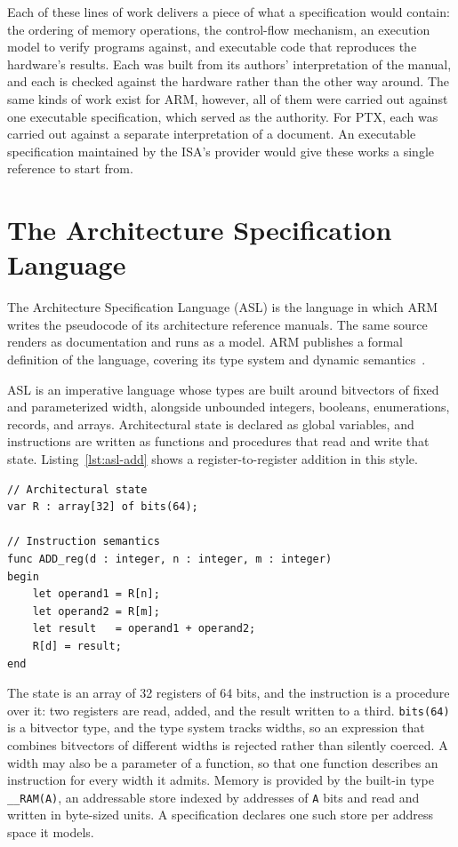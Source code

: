Each of these lines of work delivers a piece of what a specification would
contain: the ordering of memory operations, the control-flow mechanism, an
execution model to verify programs against, and executable code that
reproduces the hardware's results. Each was built from its authors'
interpretation of the manual, and each is checked against the hardware
rather than the other way around. The same kinds of work exist for ARM,
however, all of them were carried out against one executable
specification, which served as the authority. For PTX, each was carried out
against a separate interpretation of a document. An executable specification
maintained by the ISA's provider would give these works a single reference
to start from.

\section{The Architecture Specification Language}
\label{sec:asl}

The Architecture Specification Language (ASL) is the language in which ARM
writes the pseudocode of its architecture reference manuals. The same source
renders as documentation and runs as a model. ARM publishes a formal
definition of the language, covering its type system and dynamic
semantics~\cite{asl-reference}.

ASL is an imperative language whose types are built around bitvectors of
fixed and parameterized width, alongside unbounded integers, booleans,
enumerations, records, and arrays. Architectural state is declared as
global variables, and instructions are written as functions and procedures
that read and write that state. Listing~\ref{lst:asl-add} shows a
register-to-register addition in this style.

\begin{lstlisting}[language=ASL, caption={An ASL specification of a
register-to-register addition.}, label={lst:asl-add}]
// Architectural state
var R : array[32] of bits(64);

// Instruction semantics
func ADD_reg(d : integer, n : integer, m : integer)
begin
    let operand1 = R[n];
    let operand2 = R[m];
    let result   = operand1 + operand2;
    R[d] = result;
end
\end{lstlisting}

The state is an array of 32 registers of 64 bits, and the instruction is
a procedure over it: two registers are read, added, and the result written to
a third. \lstinline{bits(64)} is a bitvector type, and the type system tracks
widths, so an expression that combines bitvectors of different widths is
rejected rather than silently coerced. A width may also be a parameter of a
function, so that one function describes an instruction for every width it
admits. Memory is provided by the built-in type \lstinline{__RAM(A)}, an
addressable store indexed by addresses of \lstinline{A} bits and read and
written in byte-sized units. A specification declares one such store per
address space it models.

